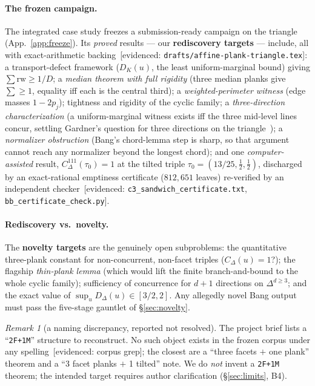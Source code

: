\documentclass[11pt]{amsart}
\theoremstyle{definition}
\theoremstyle{remark}
\newtheorem{remark}[definition]{Remark}
\newcommand{\ev}[1]{\textsf{\footnotesize[#1]}} %
\begin{document}
\paragraph{The frozen campaign.} The integrated case study freezes a
submission-ready campaign on the triangle~\cite{Lucius26}
(App.~\ref{app:freeze}). Its \emph{proved} results --- our \textbf{rediscovery
targets} --- include, all with exact-arithmetic backing~\ev{evidenced:
\texttt{drafts/affine-plank-triangle.tex}}:
a transport-defect framework ($D_K(u)$, the least uniform-marginal bound) giving
$\sum\mathrm{rw}\ge 1/D$; a \emph{median theorem with full rigidity} (three
median planks give $\sum\ge1$, equality iff each is the central third); a
\emph{weighted-perimeter witness} (edge masses $1-2p_j$); tightness and rigidity
of the cyclic family; a \emph{three-direction characterization} (a
uniform-marginal witness exists iff the three mid-level lines concur, settling
Gardner's question for three directions on the triangle~\cite{Gardner88}); a
\emph{normalizer obstruction} (Bang's chord-lemma step is sharp, so that
argument cannot reach any normalizer beyond the longest chord); and one
\emph{computer-assisted} result, $C^{111}_\Delta(\tau_0)=1$ at the tilted triple
$\tau_0=(13/25,\tfrac12,\tfrac12)$, discharged by an exact-rational emptiness
certificate ($812{,}651$ leaves) re-verified by an independent
checker~\ev{evidenced: \texttt{c3\_sandwich\_certificate.txt},
\texttt{bb\_certificate\_check.py}}.

\paragraph{Rediscovery vs.\ novelty.} The \textbf{novelty targets} are the
genuinely open subproblems: the quantitative three-plank constant for
non-concurrent, non-facet triples ($C_\Delta(u)=1$?); the flagship
\emph{thin-plank lemma} (which would lift the finite branch-and-bound to the
whole cyclic family); sufficiency of concurrence for $d{+}1$ directions on
$\Delta^{d\ge3}$; and the exact value of $\sup_u D_\Delta(u)\in[3/2,2]$. Any
allegedly novel Bang output must pass the five-stage gauntlet of
\S\ref{sec:novelty}.

\begin{remark}[a naming discrepancy, reported not resolved]
The project brief lists a ``\texttt{2F+1M}'' structure to reconstruct. No such
object exists in the frozen corpus under any spelling~\ev{evidenced: corpus
grep}; the closest are a ``three facets $+$ one plank'' theorem and a
``3 facet planks $+$ 1 tilted'' note. We do \emph{not} invent a
\texttt{2F+1M} theorem; the intended target requires author clarification
(\S\ref{sec:limits}, B4).
\end{remark}
\end{document}
